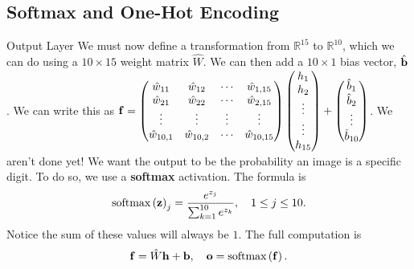 \documentclass[xcolor=dvipsnames, fontsize=11pt, %
pagesize, %
parskip=half-, t]{beamer}
\begin{document}
\subsection{Softmax and One-Hot Encoding}
\begin{frame}{Output Layer}
We must now define a transformation from $\mathbb{R}^{15}$ to $\mathbb{R}^{10}$, which we can do using a $10\times 15$ weight matrix $\hat{W}$. We can then add a $10\times 1$ bias vector, $\hat{\bold{b}}$. \pause We can write this as $\bold{f}=\begin{pmatrix} \hat{w}_{11} & \hat{w}_{12} & \cdots & \hat{w}_{1,15} \\ \hat{w}_{21} & \hat{w}_{22} & \cdots & \hat{w}_{2,15} \\ \vdots & \vdots & \vdots & \vdots \\ \hat{w}_{10,1} & \hat{w}_{10,2} & \cdots & \hat{w}_{10,15} \end{pmatrix}\begin{pmatrix} h_{1} \\ h_2 \\ \vdots \\ \vdots \\ h_{15} \end{pmatrix}+\begin{pmatrix} \hat{b}_{1} \\ \hat{b}_2 \\ \vdots \\ \hat{b}_{10} \end{pmatrix}$. \pause We aren't done yet! We want the output to be the probability an image is a specific digit. To do so, we use a \textbf{softmax} activation. The formula is $$\displaystyle \text{softmax}\left(\bold{z}\right)_{j}=\frac{e^{z_j}}{\sum_{k=1}^{10}e^{z_k}}, \quad 1\le j \le 10.$$ Notice the sum of these values will always be $1$. \pause The full computation is $$\bold{f}=\hat{W}\bold{h}+\bold{b}, \quad \bold{o}=\text{softmax}\left(\bold{f}\right).$$  
  \end{frame}
\end{document}
